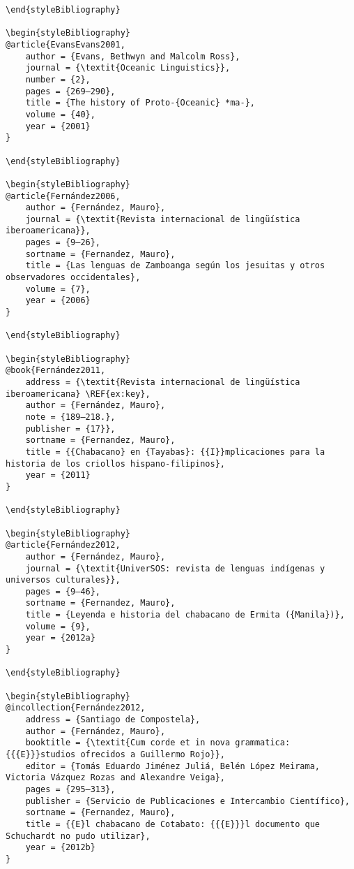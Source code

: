 \begin{stylelsUnNumberedSection}
\begin{verbatim}
\end{styleBibliography}

\begin{styleBibliography}
@article{EvansEvans2001,
	author = {Evans, Bethwyn and Malcolm Ross},
	journal = {\textit{Oceanic Linguistics}},
	number = {2},
	pages = {269–290},
	title = {The history of Proto-{Oceanic} *ma-},
	volume = {40},
	year = {2001}
}

\end{styleBibliography}

\begin{styleBibliography}
@article{Fernández2006,
	author = {Fernández, Mauro},
	journal = {\textit{Revista internacional de lingüística iberoamericana}},
	pages = {9–26},
	sortname = {Fernandez, Mauro},
	title = {Las lenguas de Zamboanga según los jesuitas y otros observadores occidentales},
	volume = {7},
	year = {2006}
}

\end{styleBibliography}

\begin{styleBibliography}
@book{Fernández2011,
	address = {\textit{Revista internacional de lingüística iberoamericana} \REF{ex:key},
	author = {Fernández, Mauro},
	note = {189–218.},
	publisher = {17}},
	sortname = {Fernandez, Mauro},
	title = {{Chabacano} en {Tayabas}: {{I}}mplicaciones para la historia de los criollos hispano-filipinos},
	year = {2011}
}

\end{styleBibliography}

\begin{styleBibliography}
@article{Fernández2012,
	author = {Fernández, Mauro},
	journal = {\textit{UniverSOS: revista de lenguas indígenas y universos culturales}},
	pages = {9–46},
	sortname = {Fernandez, Mauro},
	title = {Leyenda e historia del chabacano de Ermita ({Manila})},
	volume = {9},
	year = {2012a}
}

\end{styleBibliography}

\begin{styleBibliography}
@incollection{Fernández2012,
	address = {Santiago de Compostela},
	author = {Fernández, Mauro},
	booktitle = {\textit{Cum corde et in nova grammatica: {{{E}}}studios ofrecidos a Guillermo Rojo}},
	editor = {Tomás Eduardo Jiménez Juliá, Belén López Meirama, Victoria Vázquez Rozas and Alexandre Veiga},
	pages = {295–313},
	publisher = {Servicio de Publicaciones e Intercambio Científico},
	sortname = {Fernandez, Mauro},
	title = {{E}l chabacano de Cotabato: {{{E}}}l documento que Schuchardt no pudo utilizar},
	year = {2012b}
}


\end{verbatim}
\end{stylelsUnNumberedSection}
